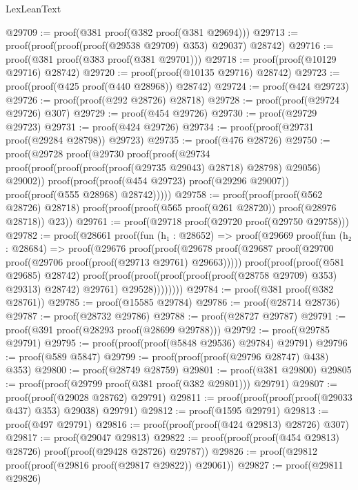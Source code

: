 \begin{lexlean}{LexLeanText}
\begin{coremodule}
@29709 := proof(@381 proof(@382 proof(@381 @29694)))
@29713 := proof(proof(proof(proof(@29538 @29709) @353) @29037) @28742)
@29716 := proof(@381 proof(@383 proof(@381 @29701)))
@29718 := proof(proof(@10129 @29716) @28742)
@29720 := proof(proof(@10135 @29716) @28742)
@29723 := proof(proof(@425 proof(@440 @28968)) @28742)
@29724 := proof(@424 @29723)
@29726 := proof(proof(@292 @28726) @28718)
@29728 := proof(proof(@29724 @29726) @307)
@29729 := proof(@454 @29726)
@29730 := proof(@29729 @29723)
@29731 := proof(@424 @29726)
@29734 := proof(proof(@29731 proof(@29284 @28798)) @29723)
@29735 := proof(@476 @28726)
@29750 := proof(@29728
      proof(@29730
          proof(proof(@29734
                proof(proof(proof(proof(proof(@29735 @29043) @28718) @28798) @29056) @29002))
              proof(proof(proof(@454 @29723) proof(@29296 @29007))
                  proof(proof(@555 @28968) @28742)))))
@29758 := proof(proof(proof(@562 @28726) @28718)
      proof(proof(proof(@565 proof(@261 @28720)) proof(@28976 @28718)) @23))
@29761 := proof(@29718 proof(@29720 proof(@29750 @29758)))
@29782 := proof(@28661
      proof(fun (h₁ : @28652) =>
        proof(@29669
            proof(fun (h₂ : @28684) =>
              proof(@29676
                  proof(proof(@29678
                        proof(@29687
                            proof(@29700 proof(@29706 proof(proof(@29713 @29761) @29663)))))
                      proof(proof(proof(@581 @29685) @28742)
                          proof(proof(proof(proof(proof(proof(@28758 @29709) @353) @29313) @28742)
                                @29761)
                              @29528))))))))
@29784 := proof(@381 proof(@382 @28761))
@29785 := proof(@15585 @29784)
@29786 := proof(@28714 @28736)
@29787 := proof(@28732 @29786)
@29788 := proof(@28727 @29787)
@29791 := proof(@391 proof(@28293 proof(@28699 @29788)))
@29792 := proof(@29785 @29791)
@29795 := proof(proof(proof(@5848 @29536) @29784) @29791)
@29796 := proof(@589 @5847)
@29799 := proof(proof(proof(@29796 @28747) @438) @353)
@29800 := proof(@28749 @28759)
@29801 := proof(@381 @29800)
@29805 := proof(proof(@29799 proof(@381 proof(@382 @29801))) @29791)
@29807 := proof(proof(@29028 @28762) @29791)
@29811 := proof(proof(proof(proof(@29033 @437) @353) @29038) @29791)
@29812 := proof(@1595 @29791)
@29813 := proof(@497 @29791)
@29816 := proof(proof(proof(@424 @29813) @28726) @307)
@29817 := proof(@29047 @29813)
@29822 := proof(proof(proof(@454 @29813) @28726) proof(proof(@29428 @28726) @29787))
@29826 := proof(@29812 proof(proof(@29816 proof(@29817 @29822)) @29061))
@29827 := proof(@29811 @29826)

\end{coremodule}
\end{lexlean}
